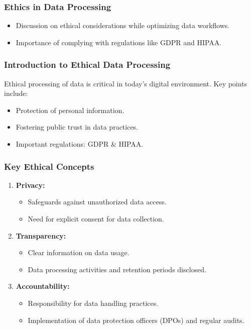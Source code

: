 \documentclass[aspectratio=169]{beamer}
\begin{document}
\begin{frame}[fragile]
    \frametitle{Ethics in Data Processing}
    \begin{itemize}
        \item Discussion on ethical considerations while optimizing data workflows.
        \item Importance of complying with regulations like GDPR and HIPAA.
    \end{itemize}
\end{frame}

\begin{frame}[fragile]
    \frametitle{Introduction to Ethical Data Processing}
    Ethical processing of data is critical in today's digital environment. Key points include:
    \begin{itemize}
        \item Protection of personal information.
        \item Fostering public trust in data practices.
        \item Important regulations: GDPR \& HIPAA.
    \end{itemize}
\end{frame}

\begin{frame}[fragile]
    \frametitle{Key Ethical Concepts}
    \begin{enumerate}
        \item \textbf{Privacy:}
            \begin{itemize}
                \item Safeguards against unauthorized data access.
                \item Need for explicit consent for data collection.
            \end{itemize}
        \item \textbf{Transparency:}
            \begin{itemize}
                \item Clear information on data usage.
                \item Data processing activities and retention periods disclosed.
            \end{itemize}
        \item \textbf{Accountability:}
            \begin{itemize}
                \item Responsibility for data handling practices.
                \item Implementation of data protection officers (DPOs) and regular audits.
            \end{itemize}
    \end{enumerate}
\end{frame}
\end{document}
